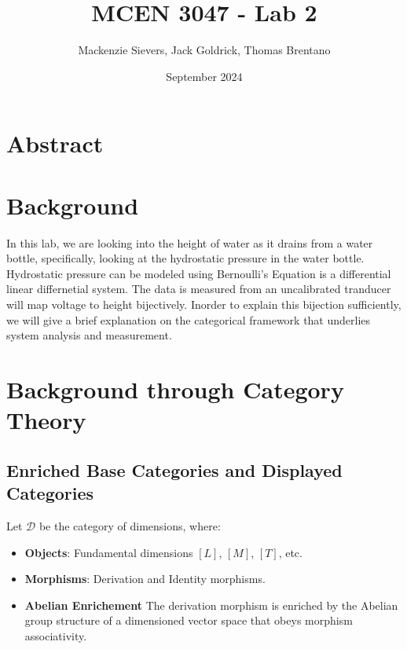 \documentclass{article}
\title{MCEN 3047  - Lab 2}
\author{Mackenzie Sievers, Jack Goldrick, Thomas Brentano }
\date{September 2024}
\theoremstyle{definition}
\theoremstyle{remark}
\begin{document}
	
	\maketitle
	
	\section{Abstract}
	\section{Background}
	In this lab, we are looking into the height of water as it drains from a water bottle, specifically, looking at the hydrostatic pressure in the water bottle.  Hydrostatic pressure can be modeled using Bernoulli's Equation is a differential linear differnetial system. The data is measured from an uncalibrated tranducer will map voltage to height bijectively.  Inorder to explain this bijection sufficiently, we will give a brief explanation on the categorical framework that underlies system analysis and measurement.
	
	
	
	
	
	
	
	
	

	
	
	
	\section{Background through Category Theory}
	
	\subsection{Enriched Base Categories and Displayed Categories }
	
	Let $\mathcal{D}$ be the category of dimensions, where:
	\begin{itemize}
		\item \textbf{Objects}: Fundamental dimensions $[L]$, $[M]$, $[T]$, etc.
		\item \textbf{Morphisms}: Derivation and Identity morphisms.
		\item \textbf{Abelian Enrichement} The derivation morphism is enriched by the Abelian group structure of a dimensioned vector space that obeys morphism associativity.
	\end{itemize}
	
\end{document}

